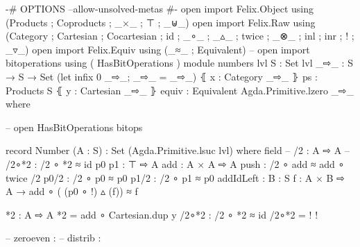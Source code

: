 

\begin{code}

{-# OPTIONS --allow-unsolved-metas #-}
open import Felix.Object using (Products ;  Coproducts ;   _×_ ; ⊤ ; _⊎_)
open import Felix.Raw using (Category ; Cartesian ; Cocartesian ; id ; _∘_ ; _▵_ ; twice ; _⊗_ ; inl ; inr ; ! ; _▿_)
open import Felix.Equiv using (_≈_ ; Equivalent)
-- open import bitoperations using ( HasBitOperations )
module numbers {lvl} {S : Set lvl} {_⇨_ : S  → S  → Set} (let infix 0 _⇨_; _⇨_ = _⇨_) ⦃ x : Category _⇨_ ⦄ {{ps : Products S}} ⦃ y : Cartesian _⇨_ ⦄{{ equiv : Equivalent Agda.Primitive.lzero _⇨_ }} where




-- open HasBitOperations bitops

record Number (A : S) : Set (Agda.Primitive.lsuc lvl) where
  field
    -- %
    /2 : A ⇨ A
    -- /2∘*2 : /2 ∘ *2 ≈ id
    p0 p1 : ⊤ ⇨ A
    add : A × A ⇨ A
    push : /2 ∘ add ≈ add ∘ twice /2
    p0/2 : /2 ∘ p0 ≈ p0
    p1/2 : /2 ∘ p1 ≈ p0
    addIdLeft : {B : S} {f : A × B ⇨ A} →  add ∘ ( (p0 ∘ !) ▵ (f)) ≈ f

  *2 : A ⇨ A
  *2 = add ∘ Cartesian.dup y
  /2∘*2 : /2 ∘ *2 ≈ id
  /2∘*2 = {! !}

    -- zeroeven : %
    -- distrib : %

\end{code}
